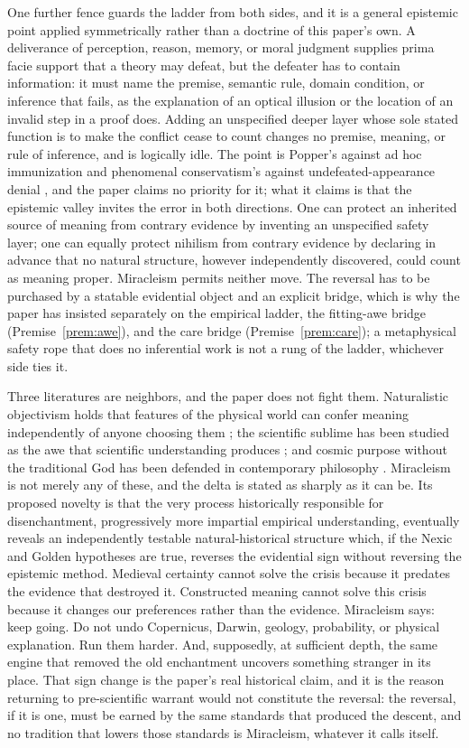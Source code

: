 One further fence guards the ladder from both sides, and it is a
general epistemic point applied symmetrically rather than a doctrine of
this paper's own. A deliverance of perception, reason, memory, or moral
judgment supplies prima facie support that a theory may defeat, but the
defeater has to contain information: it must name the premise, semantic
rule, domain condition, or inference that fails, as the explanation of
an optical illusion or the location of an invalid step in a proof does.
Adding an unspecified deeper layer whose sole stated function is to
make the conflict cease to count changes no premise, meaning, or rule
of inference, and is logically idle. The point is Popper's against ad
hoc immunization \cite{Popper63} and phenomenal conservatism's against
undefeated-appearance denial \cite{Huemer07}, and the paper claims no
priority for it; what it claims is that the epistemic valley invites the
error in both directions. One can protect an inherited source of meaning
from contrary evidence by inventing an unspecified safety layer; one can
equally protect nihilism from contrary evidence by declaring in advance
that no natural structure, however independently discovered, could
count as meaning proper. Miracleism permits neither move. The reversal
has to be purchased by a statable evidential object and an explicit
bridge, which is why the paper has insisted separately on the empirical
ladder, the fitting-awe bridge (Premise~\ref{prem:awe}), and the care
bridge (Premise~\ref{prem:care}); a metaphysical safety rope that does
no inferential work is not a rung of the ladder, whichever side ties it.

Three literatures are neighbors, and the paper does not fight them.
Naturalistic objectivism holds that features of the physical world can
confer meaning independently of anyone choosing them \cite{MetzSEP};
the scientific sublime has been studied as the awe that scientific
understanding produces \cite{Gross18}; and cosmic purpose without the
traditional God has been defended in contemporary philosophy
\cite{Mulgan15,Goff23}. Miracleism is not merely any of these, and the
delta is stated as sharply as it can be. Its proposed novelty is that
the very process historically responsible for disenchantment,
progressively more impartial empirical understanding, eventually reveals
an independently testable natural-historical structure which, if the
Nexic and Golden hypotheses are true, reverses the evidential sign
without reversing the epistemic method. Medieval certainty cannot solve
the crisis because it predates the evidence that destroyed it.
Constructed meaning cannot solve this crisis because it changes our
preferences rather than the evidence. Miracleism says: keep going. Do
not undo Copernicus, Darwin, geology, probability, or physical
explanation. Run them harder. And, supposedly, at sufficient depth, the
same engine that removed the old enchantment uncovers something stranger
in its place. That sign change is the paper's real historical claim, and
it is the reason returning to pre-scientific warrant would not
constitute the reversal: the reversal, if it is one, must be earned by
the same standards that produced the descent, and no tradition that
lowers those standards is Miracleism, whatever it calls itself.

